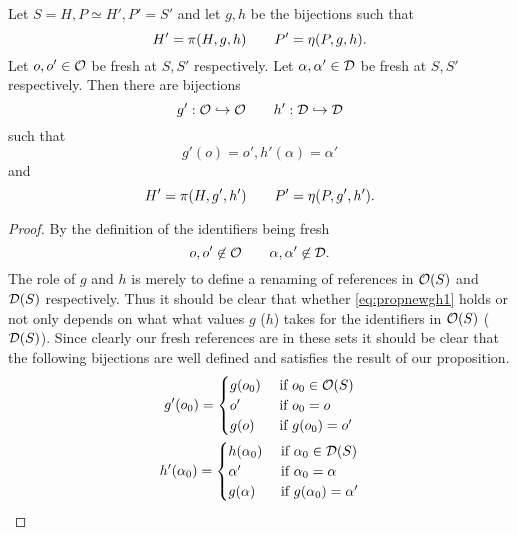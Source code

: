 \begin{proposition}
  Let $S = H, P \simeq H', P' = S'$ and let $g, h$ be the bijections such that
  \begin{equation} \label{eq:propnewgh1}
    H' = \pi(H, g, h) \quad\quad P' = \eta(P, g, h).
  \end{equation}
  Let $o, o' \in \mathcal{O}$ be fresh at $S, S'$ respectively.
  Let $\alpha, \alpha' \in \mathcal{D}$ be fresh at $S, S'$ respectively.
  Then there are bijections
  \begin{equation*}
    g': \mathcal{O} \hookrightarrow \mathcal{O} \quad\quad h': \mathcal{D} \hookrightarrow \mathcal{D}
  \end{equation*}
  such that 
  \begin{equation} \label{eq:propnewgh2}
    g'(o) = o', h'(\alpha) = \alpha'
  \end{equation} 
  and
  \begin{equation} \label{eq:propnewgh3}
    H' = \pi(H, g', h') \quad\quad P' = \eta(P, g', h').
  \end{equation}
\end{proposition}

\begin{proof}
  By the definition of the identifiers being fresh
  \begin{equation*}
    o, o' \not\in \mathcal{O} \quad\quad \alpha, \alpha' \not\in \mathcal{D}.
  \end{equation*}
  The role of $g$ and $h$ is merely to define a renaming of references in
  $\mathcal{O}(S)$ and $\mathcal{D}(S)$ respectively. Thus it should be clear that whether
  \eqref{eq:propnewgh1} holds or not only depends on what what values
  $g$ ($h$) takes for the identifiers in $\mathcal{O}(S)$ ($\mathcal{D}(S)$). Since clearly
  our fresh references are in these sets it should be clear that the following
  bijections are well defined and satisfies the result of our proposition.
  \begin{equation*}
    \begin{gathered}
      g'(o_{0}) =
      \begin{cases}
        g(o_{0}) & \text{ if } o_0 \in \mathcal{O}(S) \\
        o' & \text{ if } o_0 = o \\
        g(o) &\text{ if } g(o_0) = o'
      \end{cases} \\
      h'(\alpha_0) =
      \begin{cases}
        h(\alpha_0) & \text{ if } \alpha_0 \in \mathcal{D}(S) \\
        \alpha' & \text{ if } \alpha_0 = \alpha \\
        g(\alpha) & \text{ if } g(\alpha_0) = \alpha'
      \end{cases}
    \end{gathered}
  \end{equation*}
\end{proof}

